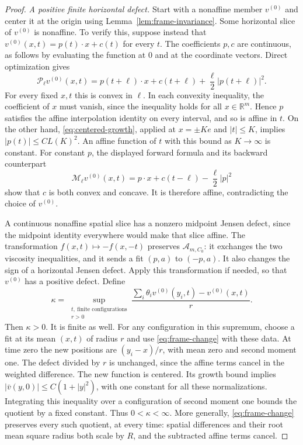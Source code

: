 \documentclass[11pt]{article}
\numberwithin{equation}{section}
\theoremstyle{definition}
\theoremstyle{remark}
\newcommand{\R}{\mathbb{R}}
\newcommand{\Penv}{\mathcal{P}}
\newcommand{\Menv}{\mathcal{M}}
\newcommand{\Aclass}{\mathcal{A}}
\begin{document}
\begin{proof}
\emph{A positive finite horizontal defect.}
Start with a nonaffine member $v^{(0)}$ and center it at the
origin using Lemma~\ref{lem:frame-invariance}. Some horizontal
slice of $v^{(0)}$ is nonaffine. To verify this, suppose instead
that
$v^{(0)}(x,t)=p(t)\cdot x+c(t)$ for every $t$. The coefficients
$p,c$ are continuous, as follows by evaluating the function at
$0$ and at the coordinate vectors. Direct optimization gives
\[
  \Penv_\ell v^{(0)}(x,t)
   =p(t+\ell)\cdot x+c(t+\ell)
                         +\frac{\ell}{2}|p(t+\ell)|^2.
\]
For every fixed $x,t$ this is convex in $\ell$. In each
convexity inequality, the coefficient of $x$ must vanish,
since the inequality holds for all $x\in\R^m$. Hence $p$
satisfies the affine interpolation identity on every interval,
and so is affine in $t$. On the other hand,
\eqref{eq:centered-growth}, applied at $x=\pm Ke$ and
$|t|\le K$, implies $|p(t)|\le C L(K)^2$. An affine function
of $t$ with this bound as $K\to\infty$ is constant. For
constant $p$, the displayed forward formula and its backward
counterpart
\[
  \Menv_\ell v^{(0)}(x,t)
   =p\cdot x+c(t-\ell)-\frac{\ell}{2}|p|^2
\]
show that $c$ is both convex and concave. It is therefore
affine, contradicting the choice of $v^{(0)}$.

A continuous nonaffine spatial slice has a nonzero midpoint
Jensen defect, since the midpoint identity everywhere would
make that slice affine. The transformation
$f(x,t)\mapsto-f(x,-t)$ preserves $\Aclass_{m,C_0}$: it
exchanges the two viscosity inequalities, and it sends a fit
$(p,a)$ to $(-p,a)$. It also changes the sign of a horizontal
Jensen defect. Apply this transformation if needed, so that
$v^{(0)}$ has a positive defect. Define
\begin{equation}\label{eq:jensen-supremum}
  \kappa=\sup_{\substack{t,\ \text{finite configurations}\\r>0}}
     \frac{\sum_i\theta_i v^{(0)}(y_i,t)-v^{(0)}(x,t)}{r}.
\end{equation}
Then $\kappa>0$. It is finite as well. For any configuration in
this supremum, choose a fit at its mean $(x,t)$ of radius $r$
and use \eqref{eq:frame-change} with these data. At time zero
the new positions are $(y_i-x)/r$, with mean zero and second
moment one. The defect divided by $r$ is unchanged, since the
affine terms cancel in the weighted difference. The new
function is centered. Its growth bound implies
$|\bar v(y,0)|\le C(1+|y|^2)$, with one constant for all these
normalizations. Integrating this inequality over a
configuration of second moment one bounds the quotient by a
fixed constant. Thus $0<\kappa<\infty$. More generally,
\eqref{eq:frame-change} preserves every such quotient, at
every time: spatial differences and their root mean square
radius both scale by $R$, and the subtracted affine terms
cancel.


\end{proof}
\end{document}

